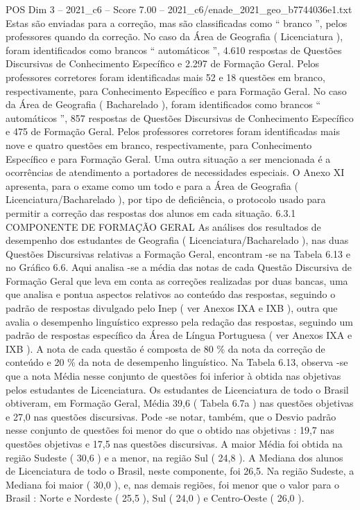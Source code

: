 \begin{textsample}{POS Dim 3 – 2021\_c6 – Score 7.00 – 2021\_c6/enade\_2021\_geo\_b7744036e1.txt}
Estas são enviadas para a correção, mas são classificadas como “ branco ”, pelos professores quando da correção.
No caso da Área de Geografia ( Licenciatura ), foram identificados como brancos “ automáticos ”, 4.610 respostas de Questões Discursivas de Conhecimento Específico e 2.297 de Formação Geral.
Pelos professores corretores foram identificadas mais 52 e 18 questões em branco, respectivamente, para Conhecimento Específico e para Formação Geral.
No caso da Área de Geografia ( Bacharelado ), foram identificados como brancos “ automáticos ”, 857 respostas de Questões Discursivas de Conhecimento Específico e 475 de Formação Geral.
Pelos professores corretores foram identificadas mais nove e quatro questões em branco, respectivamente, para Conhecimento Específico e para Formação Geral.
Uma outra situação a ser mencionada é a ocorrências de atendimento a portadores de necessidades especiais.
O Anexo XI apresenta, para o exame como um todo e para a Área de Geografia ( Licenciatura/Bacharelado ), por tipo de deficiência, o protocolo usado para permitir a correção das respostas dos alunos em cada situação. 6.3.1 COMPONENTE DE FORMAÇÃO GERAL As análises dos resultados de desempenho dos estudantes de Geografia ( Licenciatura/Bacharelado ), nas duas Questões Discursivas relativas a Formação Geral, encontram -se na Tabela 6.13 e no Gráfico 6.6.
Aqui analisa -se a média das notas de cada Questão Discursiva de Formação Geral que leva em conta as correções realizadas por duas bancas, uma que analisa e pontua aspectos relativos ao conteúdo das respostas, seguindo o padrão de respostas divulgado pelo Inep ( ver Anexos IXA e IXB ), outra que avalia o desempenho linguístico expresso pela redação das respostas, seguindo um padrão de respostas específico da Área de Língua Portuguesa ( ver Anexos IXA e IXB ).
A nota de cada questão é composta de 80 \% da nota da correção de conteúdo e 20 \% da nota de desempenho linguístico.
Na Tabela 6.13, observa -se que a nota Média nesse conjunto de questões foi inferior à obtida nas objetivas pelos estudantes de Licenciatura.
Os estudantes de Licenciatura de todo o Brasil obtiveram, em Formação Geral, Média 39,6 ( Tabela 6.7a ) nas questões objetivas e 27,0 nas questões discursivas.
Pode -se notar, também, que o Desvio padrão nesse conjunto de questões foi menor do que o obtido nas objetivas : 19,7 nas questões objetivas e 17,5 nas questões discursivas.
A maior Média foi obtida na região Sudeste ( 30,6 ) e a menor, na região Sul ( 24,8 ).
A Mediana dos alunos de Licenciatura de todo o Brasil, neste componente, foi 26,5.
Na região Sudeste, a Mediana foi maior ( 30,0 ), e, nas demais regiões, foi menor que o valor para o Brasil : Norte e Nordeste ( 25,5 ), Sul ( 24,0 ) e Centro-Oeste ( 26,0 ).

\end{textsample}
